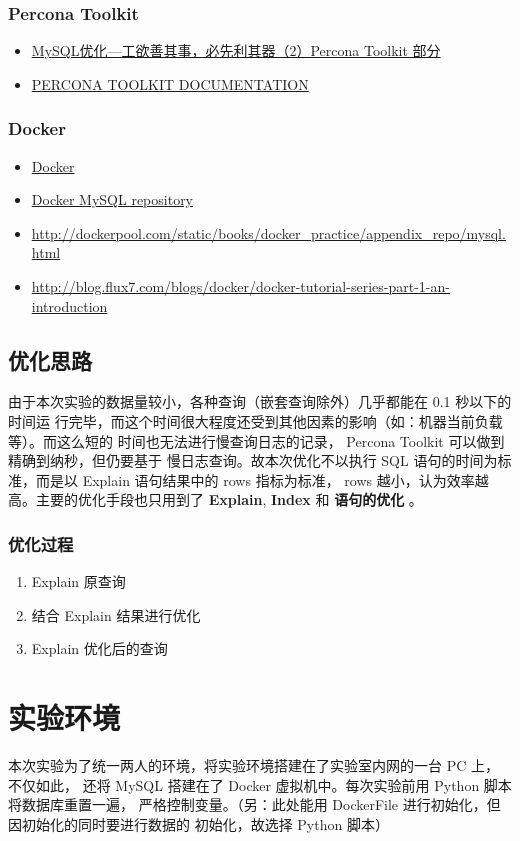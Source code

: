 \documentclass[11pt]{article}
\begin{document}
\subsubsection{Percona Toolkit}
\label{sec-1-2-5}
\begin{itemize}
\item \href{http://www.cnblogs.com/zhanjindong/p/3472804.html#PerconaToolkit}{MySQL优化—工欲善其事，必先利其器（2）Percona Toolkit 部分}
\item \href{https://www.percona.com/doc/percona-toolkit/2.1/}{PERCONA TOOLKIT DOCUMENTATION}
\end{itemize}
\subsubsection{Docker}
\label{sec-1-2-6}
\begin{itemize}
\item \href{https://www.docker.com}{Docker}
\item \href{https://registry.hub.docker.com/_/mysql/}{Docker MySQL repository}
\item \url{http://dockerpool.com/static/books/docker_practice/appendix_repo/mysql.html}
\item \url{http://blog.flux7.com/blogs/docker/docker-tutorial-series-part-1-an-introduction}
\end{itemize}
\subsection{优化思路}
\label{sec-1-3}
由于本次实验的数据量较小，各种查询（嵌套查询除外）几乎都能在 0.1 秒以下的时间运
行完毕，而这个时间很大程度还受到其他因素的影响（如：机器当前负载等）。而这么短的
时间也无法进行慢查询日志的记录， Percona Toolkit 可以做到精确到纳秒，但仍要基于
慢日志查询。故本次优化不以执行 SQL 语句的时间为标准，而是以 Explain 语句结果中的
rows 指标为标准， rows 越小，认为效率越高。主要的优化手段也只用到了 \textbf{Explain},
\textbf{Index} 和 \textbf{语句的优化} 。
\subsubsection{优化过程}
\label{sec-1-3-1}
\begin{enumerate}
\item Explain 原查询
\item 结合 Explain 结果进行优化
\item Explain 优化后的查询
\end{enumerate}
\section{实验环境}
\label{sec-2}
本次实验为了统一两人的环境，将实验环境搭建在了实验室内网的一台 PC 上，不仅如此，
还将 MySQL 搭建在了 Docker 虚拟机中。每次实验前用 Python 脚本将数据库重置一遍，
严格控制变量。（另：此处能用 DockerFile 进行初始化，但因初始化的同时要进行数据的
初始化，故选择 Python 脚本）
\end{document}
